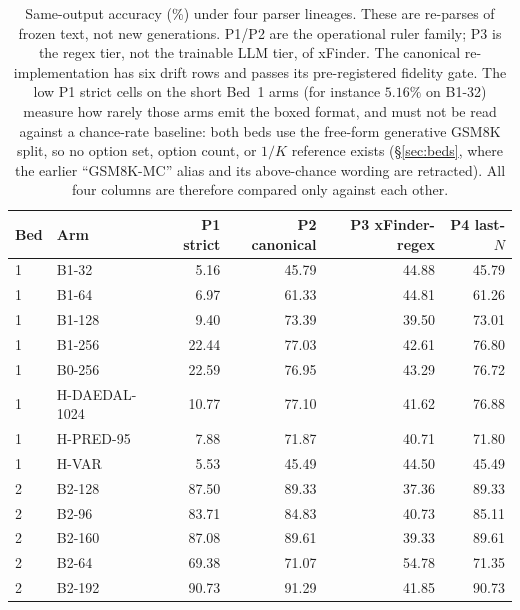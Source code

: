 \documentclass{article}
\begin{document}
\begin{table}[!htbp]
\centering\footnotesize
\setlength{\tabcolsep}{4pt}
\begin{tabular}{@{}llrrrr@{}}
\toprule
Bed & Arm & \textsc{P1} strict & \textsc{P2} canonical & \textsc{P3} xFinder-regex & \textsc{P4} last-$N$ \\
\midrule
1 & \textsc{B1-32} & 5.16 & 45.79 & 44.88 & 45.79 \\
1 & \textsc{B1-64} & 6.97 & 61.33 & 44.81 & 61.26 \\
1 & \textsc{B1-128} & 9.40 & 73.39 & 39.50 & 73.01 \\
1 & \textsc{B1-256} & 22.44 & 77.03 & 42.61 & 76.80 \\
1 & \textsc{B0-256} & 22.59 & 76.95 & 43.29 & 76.72 \\
1 & \textsc{H-DAEDAL-1024} & 10.77 & 77.10 & 41.62 & 76.88 \\
1 & \textsc{H-PRED-95} & 7.88 & 71.87 & 40.71 & 71.80 \\
1 & \textsc{H-VAR} & 5.53 & 45.49 & 44.50 & 45.49 \\
\midrule
2 & \textsc{B2-128} & 87.50 & 89.33 & 37.36 & 89.33 \\
2 & \textsc{B2-96} & 83.71 & 84.83 & 40.73 & 85.11 \\
2 & \textsc{B2-160} & 87.08 & 89.61 & 39.33 & 89.61 \\
2 & \textsc{B2-64} & 69.38 & 71.07 & 54.78 & 71.35 \\
2 & \textsc{B2-192} & 90.73 & 91.29 & 41.85 & 90.73 \\
\bottomrule
\end{tabular}
\caption{Same-output accuracy (\%) under four parser lineages.  These are
re-parses of frozen text, not new generations.  \textsc{P1}/\textsc{P2} are
the operational ruler family; \textsc{P3} is the regex tier, not the trainable
LLM tier, of xFinder.  The canonical re-implementation has six drift rows and
passes its pre-registered fidelity gate.  The low \textsc{P1} strict cells on
the short Bed~1 arms (for instance $5.16\%$ on \textsc{B1-32}) measure how
rarely those arms emit the boxed format, and must not be read against a
chance-rate baseline: both beds use the free-form generative GSM8K split, so no
option set, option count, or $1/K$ reference exists (\S\ref{sec:beds}, where the
earlier ``GSM8K-MC'' alias and its above-chance wording are retracted).  All
four columns are therefore compared only against each other.}
\label{tab:parser-lineage}
\end{table}
\end{document}
